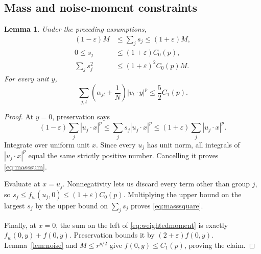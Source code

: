 \documentclass[11pt,letterpaper]{article}
\newtheorem{lemma}[theorem]{Lemma}
\theoremstyle{definition}
\theoremstyle{remark}
\numberwithin{equation}{section}
\newcommand{\eps}{\varepsilon}
\begin{document}
\subsection{Mass and noise-moment constraints}
\begin{lemma}\label{lem:mass}
Under the preceding assumptions,
\begin{align}
 (1-\eps)M&\le\sum_js_j\le(1+\eps)M,\label{eq:masssum}\\
 0\le s_j&\le(1+\eps)C_0(p),\label{eq:masseach}\\
 \sum_js_j^2&\le(1+\eps)^2C_0(p)M.\label{eq:masssquare}
\end{align}
For every unit $y$,
\begin{equation}\label{eq:weightedmoment}
 \sum_{j,t}\left(\alpha_{jt}+\frac1N\right)|v_t\cdot y|^p
 \le\frac52 C_1(p).
\end{equation}
\end{lemma}
\begin{proof}
At $y=0$, preservation says
\[
 (1-\eps)\sum_j|u_j\cdot x|^p
 \le\sum_js_j|u_j\cdot x|^p
 \le(1+\eps)\sum_j|u_j\cdot x|^p.
\]
Integrate over uniform unit $x$. Since every $u_j$ has unit norm, all integrals of $|u_j\cdot x|^p$ equal the same strictly positive number. Cancelling it proves \eqref{eq:masssum}.

Evaluate at $x=u_j$. Nonnegativity lets us discard every term other than group $j$, so $s_j\le f_w(u_j,0)\le(1+\eps)C_0(p)$. Multiplying the upper bound on the largest $s_j$ by the upper bound on $\sum_js_j$ proves \eqref{eq:masssquare}.

Finally, at $x=0$, the sum on the left of \eqref{eq:weightedmoment} is exactly $f_w(0,y)+f(0,y)$. Preservation bounds it by $(2+\eps)f(0,y)$. Lemma~\ref{lem:noise} and $M\le r^{p/2}$ give $f(0,y)\le C_1(p)$, proving the claim.
\end{proof}
\end{document}
